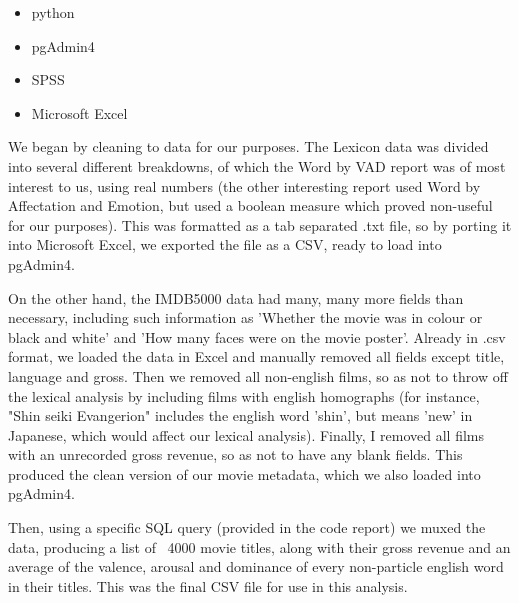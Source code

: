 \documentclass[12pt,a4paper]{article}
\begin{document}
    \begin{itemize}
        \item python
        \item pgAdmin4
        \item SPSS
        \item Microsoft Excel
    \end{itemize}
    
    
    We began by cleaning to data for our purposes. The Lexicon data was divided into several different breakdowns, of which the Word by VAD report was of most interest to us, using real numbers (the other interesting report used Word by Affectation and Emotion, but used a boolean measure which proved non-useful for our purposes). This was formatted as a tab separated .txt file, so by porting it into Microsoft Excel, we exported the file as a CSV, ready to load into pgAdmin4. 
    
    On the other hand, the IMDB5000 data had many, many more fields than necessary, including such information as 'Whether the movie was in colour or black and white' and 'How many faces were on the movie poster'. Already in .csv format, we loaded the data in Excel and manually removed all fields except title, language and gross. Then we removed all non-english films, so as not to throw off the lexical analysis by including films with english homographs (for instance, "Shin seiki Evangerion" includes the english word 'shin', but means 'new' in Japanese, which would affect our lexical analysis). Finally, I removed all films with an unrecorded gross revenue, so as not to have any blank fields. This produced the clean version of our movie metadata, which we also loaded into pgAdmin4.
    
    Then, using a specific SQL query (provided in the code report) we muxed the data, producing a list of ~4000 movie titles, along with their gross revenue and an average of the valence, arousal and dominance of every non-particle english word in their titles. This was the final CSV file for use in this analysis.
\end{document}
